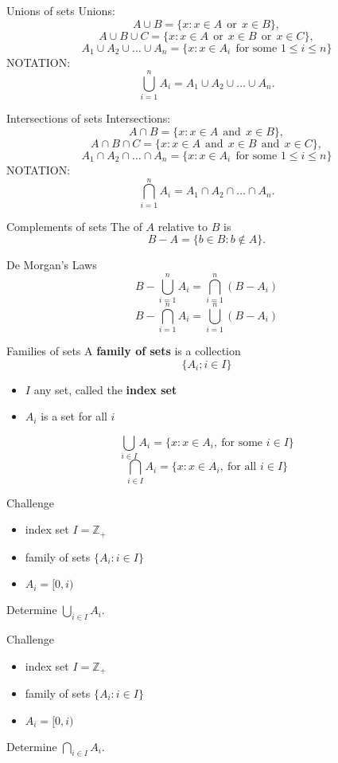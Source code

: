 \documentclass{beamer}
\begin{document}
\begin{frame}{Unions of sets}
Unions:
\pause
$$A\cup B = \{x: x\in A\ \ \text{or}\ \ x\in B\},$$
\pause
$$A\cup B\cup C = \{x: x\in A\ \ \text{or}\ \ x\in B\ \ \text{or}\ \ x\in C\},$$
\pause
$$A_1\cup A_2\cup \dots \cup A_n = \{x: x\in A_i\ \ \text{for some $1\leq i\leq n$}\}$$
\pause
{\color{red}NOTATION:}
$$\bigcup_{i=1}^n A_i = A_1\cup A_2\cup \dots \cup A_n.$$
\end{frame}

\begin{frame}{Intersections of sets}
Intersections:
\pause
$$A\cap B = \{x: x\in A\ \ \text{and}\ \ x\in B\},$$
\pause
$$A\cap B\cap C = \{x: x\in A\ \ \text{and}\ \ x\in B\ \ \text{and}\ \ x\in C\},$$
\pause
$$A_1\cap A_2\cap \dots \cap A_n = \{x: x\in A_i\ \ \text{for some $1\leq i\leq n$}\}$$
\pause
{\color{red}NOTATION:}
$$\bigcap_{i=1}^n A_i = A_1\cap A_2\cap \dots \cap A_n.$$
\end{frame}

\begin{frame}{Complements of sets}
\pause
The  of $A$ relative to $B$ is
$$B-A = \{b\in B: b\notin A\}.$$
\pause
\begin{thm}{De Morgan's Laws}
\pause
$$B-\bigcup_{i=1}^n A_i = \bigcap_{i=1}^n (B-A_i)$$
\pause
$$B-\bigcap_{i=1}^n A_i = \bigcup_{i=1}^n (B-A_i)$$
\end{thm}
\end{frame}


\begin{frame}{Families of sets}
A \textbf{family of sets} is a collection
$$\{A_i; i\in I\}$$
\begin{itemize}
\pause
\item $I$ any set, called the \textbf{index set}
\pause
\item $A_i$ is a set for all $i$
\end{itemize}
\pause
$$\bigcup_{i\in I} A_i = \{x: x\in A_i,\ \text{for some $i\in I$}\}$$
\pause
$$\bigcap_{i\in I} A_i = \{x: x\in A_i,\ \text{for all $i\in I$}\}$$
\end{frame}

\begin{frame}{Challenge}
\begin{itemize}
\item index set $I = \mathbb{Z}_+$
\item family of sets $\{A_i: i\in I\}$
\item $A_i = [0,i)$
\end{itemize}
\begin{prob}
Determine $\bigcup_{i\in I} A_i$.
\end{prob}
\end{frame}

\begin{frame}{Challenge}
\begin{itemize}
\item index set $I = \mathbb{Z}_+$
\item family of sets $\{A_i: i\in I\}$
\item $A_i = [0,i)$
\end{itemize}
\begin{prob}
Determine $\bigcap_{i\in I} A_i$.
\end{prob}
\end{frame}
\end{document}
